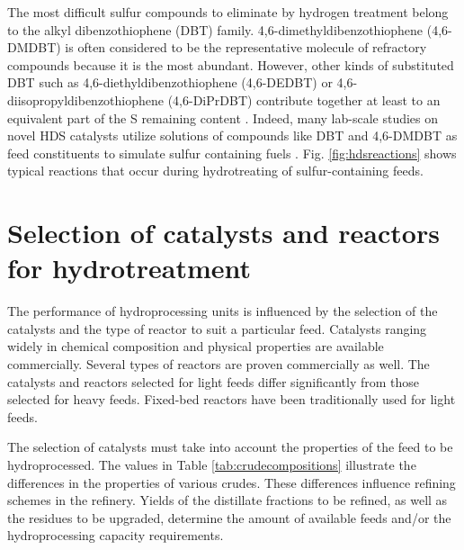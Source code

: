 The most difficult sulfur compounds to eliminate by hydrogen treatment belong to the alkyl dibenzothiophene (DBT) family. 4,6-dimethyldibenzothiophene (4,6-DMDBT) is often considered to be the representative molecule of refractory compounds because it is the most abundant. However, other kinds of substituted DBT such as 4,6-diethyldibenzothiophene (4,6-DEDBT) or 4,6-diisopropyldibenzothiophene (4,6-DiPrDBT) contribute together at least to an equivalent part of the S remaining content \citep{Breysse2003129}. Indeed, many lab-scale studies on novel HDS catalysts utilize solutions of compounds like DBT and 4,6-DMDBT as feed constituents to simulate sulfur containing fuels \citep{Gupta2016246,Fraile2016680,Souza2015217,SilvaRodrigo20152,Wang2009206}. Fig. \ref{fig:hdsreactions} shows typical reactions that occur during hydrotreating of sulfur-containing feeds.

%
%
%
%

\section{Selection of catalysts and reactors for hydrotreatment}

The performance of hydroprocessing units is influenced by the selection of the catalysts and the type of reactor to suit a particular feed. Catalysts ranging widely in chemical composition and physical properties are available commercially. Several types of reactors are proven commercially as well. The catalysts and reactors selected for light feeds differ significantly from those selected for heavy feeds. Fixed-bed reactors have been traditionally used for light feeds.

The selection of catalysts must take into account the properties of the feed to be hydroprocessed. The values in Table \ref{tab:crudecompositions} illustrate the differences in the properties of various crudes. These differences influence refining schemes in the refinery. Yields of the distillate fractions to be refined, as well as the residues to be upgraded, determine the amount of available feeds and/or the hydroprocessing capacity requirements.

